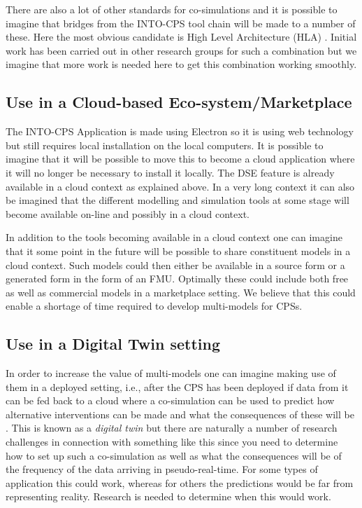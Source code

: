 There are also a lot of other standards for co-simulations \cite{Gomes&18} and it is possible to imagine that bridges from the INTO-CPS tool chain will be made to a number of these. Here the most obvious candidate is High Level Architecture (HLA) \cite{IEEE1516}. Initial work has been carried out in other research groups for such a combination \cite{Neema&14,Awais&17} but we imagine that more work is needed here to get this combination working smoothly.


\subsection{Use in a Cloud-based Eco-system/Marketplace}

The INTO-CPS Application is made using Electron so it is using web technology but still requires local installation on the local computers. It is possible to imagine that it will be possible to move this to become a cloud application where it will no longer be necessary to install it locally. The DSE feature is already available in a cloud context as explained above. In a very long context it can also be imagined that the different modelling and simulation tools at some stage will become available on-line and possibly in a cloud context.

In addition to the tools becoming available in a cloud context one can imagine that it some point in the future will be possible to share constituent models in a cloud context. Such models could then either be available in a source form or a generated form in the form of an FMU. Optimally these could include both free as well as commercial models in a marketplace setting. We believe that this could enable a shortage of time required to develop multi-models for CPSs.

\subsection{Use in a Digital Twin setting}

In order to increase the value of multi-models one can imagine making use of them in a deployed setting, i.e., after the CPS has been deployed if data from it can be fed back to a cloud where a co-simulation can be used to predict how alternative interventions can be made and what the consequences of these will be \cite{Gamble&18}. This is known as a \emph{digital twin} but there are naturally a number of research challenges in connection with something like this since you need to determine how to set up such a co-simulation as well as what the consequences will be of the frequency of the data arriving in pseudo-real-time. For some types of application this could work, whereas for others the predictions would be far from representing reality. Research is needed to determine when this would work.

